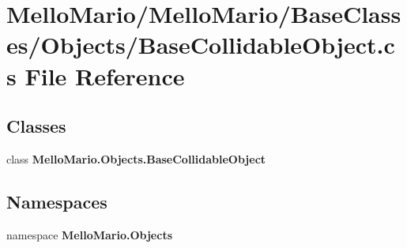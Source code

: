 \section{Mello\+Mario/\+Mello\+Mario/\+Base\+Classes/\+Objects/\+Base\+Collidable\+Object.cs File Reference}
\label{BaseCollidableObject_8cs}
\subsection*{Classes}
\begin{DoxyCompactItemize}
\item 
class \textbf{ Mello\+Mario.\+Objects.\+Base\+Collidable\+Object}
\end{DoxyCompactItemize}
\subsection*{Namespaces}
\begin{DoxyCompactItemize}
\item 
namespace \textbf{ Mello\+Mario.\+Objects}
\end{DoxyCompactItemize}
